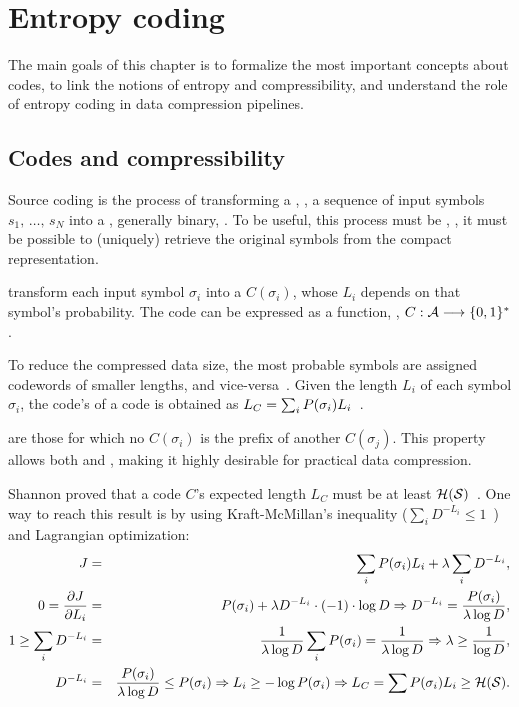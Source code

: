 \chapter{Entropy coding}\label{sec:coding}

The main goals of this chapter is to formalize the most important concepts about
codes, to link the notions of entropy and compressibility, and understand the
role of entropy coding in data compression pipelines.

\section{Codes and compressibility}
Source coding is the process of transforming a , \ie,
a sequence of input symbols $s_1,\,\ldots,\,s_N$ into
a , generally binary, . To be useful,
this process must be , \ie, it must be possible to
(uniquely) retrieve the original symbols from the compact representation.

 transform each
input symbol $\sigma_i$ into a  $C(\sigma_i)$,
whose  $L_i$ depends on that symbol's
probability.
The code can be expressed as a function, \eg, \mbox{$C: \mathcal{A} \longrightarrow \{0,1\}^{*}$}.

To reduce the compressed data size, the most probable symbols are
assigned codewords of smaller lengths, and
vice-versa~\cite[\S 2.4, \S 2.4.1, \S 2.4.2]{sayood_introduction}.
%
Given the length $L_i$ of each symbol $\sigma_i$,
the code's  of a code is obtained as
$L_C = \sum_i P(\sigma_i) L_i$~\cite[\S 5.1]{cover_elements}.

 are those for which no $C(\sigma_i)$
is the prefix of another $C(\sigma_j)$.
This property allows both 
and , making it highly desirable for practical data compression.

Shannon proved that a code $C$'s expected length $L_C$ must be
at least $\mathcal{H}(\mathcal{S})$~\cite[\S 5.4]{cover_elements}. One way to reach this
result is by using Kraft-McMillan's inequality ($\sum_i D^{-L_i} \le 1$~\cite[\S 2.4.3]{sayood_introduction}) and Lagrangian optimization:
\begin{eqnarray*}
J &=& \sum_i P(\sigma_i) L_i + \lambda \sum_i D^{-L_i}, \\
0 = \frac{\partial J}{\partial L_i} &=& P(\sigma_i) + \lambda D^{-L_i} \cdot (-1) \cdot \log D
\Rightarrow D^{-L_i} = \frac{P(\sigma_i)}{\lambda \log D}, \\
1 \ge \sum_i D^{-L_i} &=& \frac{1}{\lambda \log D} \sum_i P(\sigma_i) = \frac{1}{\lambda \log D}
\Rightarrow \lambda \ge \frac{1}{\log D}, \\
D^{-L_i} &=& \frac{P(\sigma_i)}{\lambda \log D} \le P(\sigma_i) \Rightarrow L_i \ge - \log P(\sigma_i)
\Rightarrow L_C = \sum P(\sigma_i) L_i \ge \mathcal{H}(\mathcal{S}).
\end{eqnarray*}

